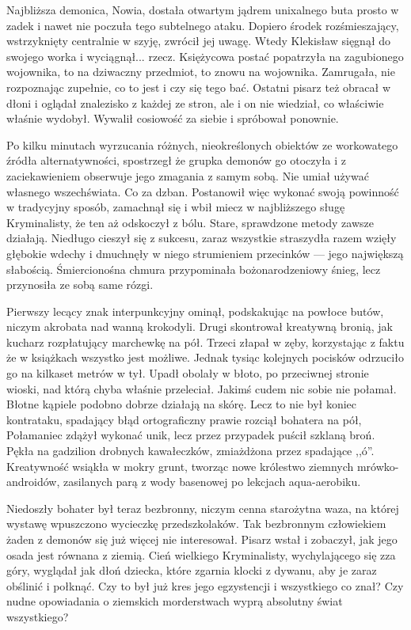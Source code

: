 Najbliższa demonica, Nowia, dostała otwartym jądrem unixalnego buta prosto w zadek i nawet nie poczuła tego subtelnego ataku.
Dopiero środek rozśmieszający, wstrzyknięty centralnie w szyję, zwrócił jej uwagę.
Wtedy Klekisław sięgnął do swojego worka i wyciągnął... rzecz.
Księżycowa postać popatrzyła na zagubionego wojownika, to na dziwaczny przedmiot, to znowu na wojownika. 
Zamrugała, nie rozpoznając zupełnie, co to jest i czy się tego bać.
Ostatni pisarz też obracał w dłoni i oglądał znalezisko z każdej ze stron, ale i on nie wiedział, co właściwie właśnie wydobył.
Wywalił cosiowość za siebie i spróbował ponownie.

Po kilku minutach wyrzucania różnych, nieokreślonych obiektów ze workowatego źródła alternatywności, spostrzegł że grupka demonów go otoczyła i z zaciekawieniem obserwuje jego zmagania z samym sobą.
Nie umiał używać własnego wszechświata. Co za dzban. 
Postanowił więc wykonać swoją powinność w tradycyjny sposób, zamachnął się i wbił miecz w najbliższego sługę Kryminalisty, że ten aż odskoczył z bólu. 
Stare, sprawdzone metody zawsze działają.
Niedługo cieszył się z sukcesu, zaraz wszystkie straszydła razem wzięły głębokie wdechy i dmuchnęły w niego strumieniem przecinków --- jego największą słabością.
Śmiercionośna chmura przypominała bożonarodzeniowy śnieg, lecz przynosiła ze sobą same rózgi.

Pierwszy lecący znak interpunkcyjny ominął, podskakując na powłoce butów, niczym akrobata nad wanną krokodyli. 
Drugi skontrował kreatywną bronią, jak kucharz rozpłatujący marchewkę na pół.
Trzeci złapał w zęby, korzystając z faktu że w książkach wszystko jest możliwe.
Jednak tysiąc kolejnych pocisków odrzuciło go na kilkaset metrów w tył.
Upadł obolały w błoto, po przeciwnej stronie wioski, nad którą chyba właśnie przeleciał. Jakimś cudem nic sobie nie połamał. 
Błotne kąpiele podobno dobrze działają na skórę.
Lecz to nie był koniec kontrataku, spadający błąd ortograficzny prawie rozciął bohatera na pół, Połamaniec zdążył wykonać unik, lecz przez przypadek puścił szklaną broń. 
Pękła na gadzilion drobnych kawałeczków, zmiażdżona przez spadające ,,ó''.
Kreatywność wsiąkła w mokry grunt, tworząc nowe królestwo ziemnych mrówko-androidów, zasilanych parą z wody basenowej po lekcjach aqua-aerobiku.

Niedoszły bohater był teraz bezbronny, niczym cenna starożytna waza, na której wystawę wpuszczono wycieczkę przedszkolaków. 
Tak bezbronnym człowiekiem żaden z demonów się już więcej nie interesował. Pisarz wstał i zobaczył, jak jego osada jest równana z ziemią.
Cień wielkiego Kryminalisty, wychylającego się zza góry, wyglądał jak dłoń dziecka, które zgarnia klocki z dywanu, aby je zaraz obślinić i połknąć.
Czy to był już kres jego egzystencji i wszystkiego co znał?
Czy nudne opowiadania o ziemskich morderstwach wyprą absolutny świat wszystkiego?

